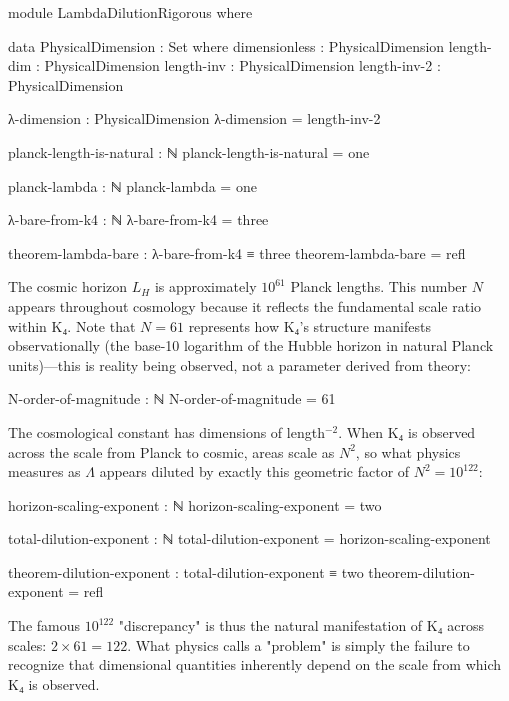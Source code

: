 \documentclass[11pt,a4paper]{book}
\begin{document}
\begin{code}
module LambdaDilutionRigorous where

  data PhysicalDimension : Set where
    dimensionless : PhysicalDimension
    length-dim    : PhysicalDimension
    length-inv    : PhysicalDimension
    length-inv-2  : PhysicalDimension
    
  λ-dimension : PhysicalDimension
  λ-dimension = length-inv-2
  
  planck-length-is-natural : ℕ
  planck-length-is-natural = one
  
  planck-lambda : ℕ
  planck-lambda = one
  
  λ-bare-from-k4 : ℕ
  λ-bare-from-k4 = three
  
  theorem-lambda-bare : λ-bare-from-k4 ≡ three
  theorem-lambda-bare = refl
\end{code}

The cosmic horizon $L_H$ is approximately $10^{61}$ Planck lengths. This number $N$ appears throughout cosmology because it reflects the fundamental scale ratio within K₄. Note that $N = 61$ represents how K₄'s structure manifests observationally (the base-10 logarithm of the Hubble horizon in natural Planck units)—this is reality being observed, not a parameter derived from theory:

\begin{code}
  N-order-of-magnitude : ℕ
  N-order-of-magnitude = 61
\end{code}

The cosmological constant has dimensions of length$^{-2}$. When K₄ is observed across the scale from Planck to cosmic, areas scale as $N^2$, so what physics measures as $\Lambda$ appears diluted by exactly this geometric factor of $N^2 = 10^{122}$:

\begin{code}
  horizon-scaling-exponent : ℕ
  horizon-scaling-exponent = two
  
  total-dilution-exponent : ℕ
  total-dilution-exponent = horizon-scaling-exponent
  
  theorem-dilution-exponent : total-dilution-exponent ≡ two
  theorem-dilution-exponent = refl
\end{code}

The famous $10^{122}$ "discrepancy" is thus the natural manifestation of K₄ across scales: $2 \times 61 = 122$. What physics calls a "problem" is simply the failure to recognize that dimensional quantities inherently depend on the scale from which K₄ is observed.
\end{document}
